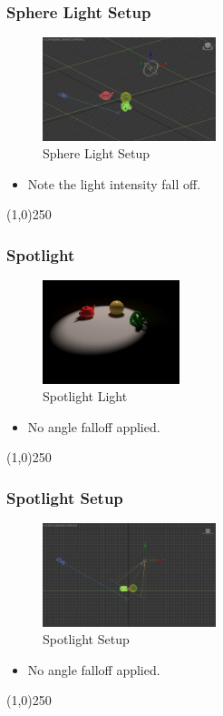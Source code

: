 \begin{frame}
	\frametitle{Sphere Light Setup}
	\begin{figure}
		\centering
		\includegraphics[height=3cm]{./Lights/SphereSetup}
		\caption{Sphere Light Setup}
		\label{fig:SphereLightSetup}
	\end{figure}
	\begin{itemize}
		\item Note the light intensity fall off.
	\end{itemize}
\end{frame}
\begin{center}\line(1,0){250}\end{center}




\begin{frame}
	\frametitle{Spotlight}
	\begin{figure}
		\centering
		\includegraphics[height=3cm]{./Lights/Spotlight}
		\caption{Spotlight Light}
		\label{fig:SpotlightLight}
	\end{figure}
	\begin{itemize}
		\item No angle falloff applied.
	\end{itemize}
\end{frame}
\begin{center}\line(1,0){250}\end{center}

\begin{frame}
	\frametitle{Spotlight Setup}
	\begin{figure}
		\centering
		\includegraphics[height=3cm]{./Lights/SpotlightSetup}
		\caption{Spotlight Setup}
		\label{fig:SpotlightSetup}
	\end{figure}
	\begin{itemize}
		\item No angle falloff applied.
	\end{itemize}
\end{frame}
\begin{center}\line(1,0){250}\end{center}


